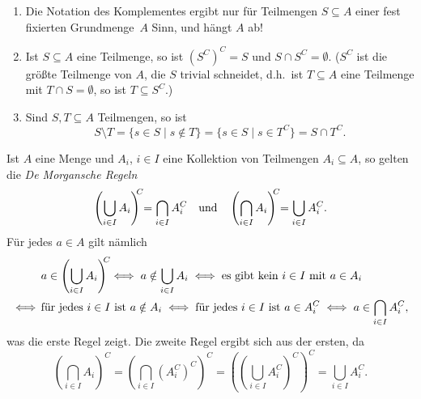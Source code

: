 \begin{bem}
 \begin{enumerate}[leftmargin=*]
  \item
   Die Notation des Komplementes ergibt nur für Teilmengen $S \subseteq A$ einer fest fixierten Grundmenge  $A$ Sinn, und hängt $A$ ab!
  \item
   Ist $S \subseteq A$ eine Teilmenge, so ist $(S^C)^C = S$ und $S \cap S^C = \emptyset$. ($S^C$ ist die größte Teilmenge von $A$, die $S$ trivial schneidet, d.h.\ ist $T \subseteq A$ eine Teilmenge mit $T \cap S = \emptyset$, so ist $T \subseteq S^C$.)
  \item
   Sind $S, T \subseteq A$ Teilmengen, so ist
   \[
    S \setminus T
    = \{s \in S \mid s \notin T\}
    = \{s \in S \mid s \in T^C\}
    = S \cap T^C.
   \]
 \end{enumerate}
\end{bem}


\begin{bem}
 Ist $A$ eine Menge und $A_i$, $i \in I$ eine Kollektion von Teilmengen $A_i \subseteq A$, so gelten die \emph{De Morgansche Regeln}
 \[
  \left( \bigcup_{i \in I} A_i \right)^{\mathclap{C}} = \bigcap_{i \in I} A_i^C
  \quad\text{und}\quad
  \left( \bigcap_{i \in I} A_i \right)^{\mathclap{C}} = \bigcup_{i \in I} A_i^C.
 \]
 Für jedes $a \in A$ gilt nämlich
 \begin{align*}
      &\, a \in \left( \bigcup_{i \in I} A_i \right)^{\mathclap{C}}
  \iff    a \notin \bigcup_{i \in I} A_i
  \iff    \text{es gibt kein $i \in I$ mit $a \in A_i$} \\
  \iff&\, \text{für jedes $i \in I$ ist $a \notin A_i$}
  \iff    \text{für jedes $i \in I$ ist $a \in A_i^C$}
  \iff    a \in \bigcap_{i \in I} A_i^C,
 \end{align*}
 was die erste Regel zeigt. Die zweite Regel ergibt sich aus der ersten, da
 \[
  \left( \bigcap_{i \in I} A_i \right)^C
  = \left( \bigcap_{i \in I} (A_i^C)^C \right)^C
  = \left( \left( \bigcup_{i \in I} A_i^C \right)^C \right)^C
  = \bigcup_{i \in I} A_i^C.
 \]
\end{bem}


